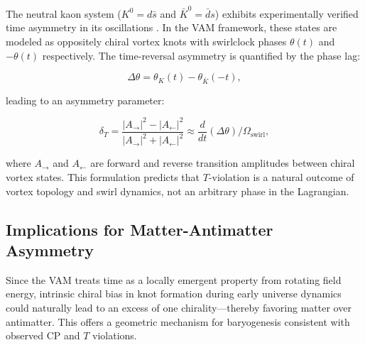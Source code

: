 The neutral kaon system ($K^0 = d\bar{s}$ and $\bar{K}^0 = \bar{d}s$) exhibits experimentally verified time asymmetry in its oscillations \cite{christenson1964evidence,cplear1998tviolation}. In the VAM framework, these states are modeled as oppositely chiral vortex knots with swirlclock phases $\theta(t)$ and $-\theta(t)$ respectively. The time-reversal asymmetry is quantified by the phase lag:

\begin{equation}
\Delta \theta = \theta_K(t) - \theta_{\bar{K}}(-t),
\end{equation}

leading to an asymmetry parameter:

\begin{equation}
\delta_T = \frac{|A_{\rightarrow}|^2 - |A_{\leftarrow}|^2}{|A_{\rightarrow}|^2 + |A_{\leftarrow}|^2} \approx \frac{d}{dt} (\Delta \theta) \Big/ \Omega_{\text{swirl}},
\end{equation}

where $A_{\rightarrow}$ and $A_{\leftarrow}$ are forward and reverse transition amplitudes between chiral vortex states. This formulation predicts that $T$-violation is a natural outcome of vortex topology and swirl dynamics, not an arbitrary phase in the Lagrangian.

\subsection{Implications for Matter-Antimatter Asymmetry}

Since the VAM treats time as a locally emergent property from rotating field energy, intrinsic chiral bias in knot formation during early universe dynamics could naturally lead to an excess of one chirality—thereby favoring matter over antimatter. This offers a geometric mechanism for baryogenesis consistent with observed CP and $T$ violations.

